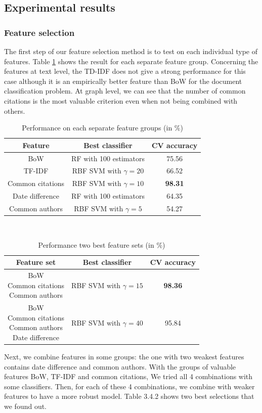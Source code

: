 \documentclass{article}
\begin{document}
\subsection{Experimental results}
\label{sec:result}
\subsubsection{Feature selection}
The first step of our feature selection method is to test on each individual type of features. Table \ref{tab:separate} shows the result for each separate feature group. Concerning the features at text level, the TD-IDF does not give a strong performance for this case although it is an empirically better feature than BoW for the document classification problem. At graph level, we can see that the number of common citations is the most valuable criterion even when not being combined with others. 
\begin{table}[t]
	\label{tab:separate}
	\centering
	\caption{Performance on each separate feature groups (in $\%$)}
	\begin{tabular}{|c|c|c|} \hline
		Feature&Best classifier&CV accuracy\\ \hline
		BoW&RF with 100 estimators&75.56\\ \hline
		TF-IDF&RBF SVM with $\gamma=20$&66.52\\ \hline
		Common citations&RBF SVM with $\gamma=10$&\textbf{98.31}\\ \hline
		Date difference&RF with 100 estimators&64.35\\ \hline
		Common authors&RBF SVM with $\gamma=5$&54.27\\ \hline
	\end{tabular}
\end{table}\\
\begin{table}[t]
	\label{tab:combination}
	\centering
	\caption{Performance two best feature sets (in $\%$)}
	\begin{tabular}{|c|c|c|} \hline
		Feature set&Best classifier&CV accuracy\\ \hline
		\pbox{20cm}{BoW\\Common citations\\Common authors}&RBF SVM with $\gamma=15$&\textbf{98.36}\\ \hline
		\pbox{20cm}{BoW\\Common citations\\Common authors\\Date difference}&RBF SVM with $\gamma=40$&95.84\\ \hline
	\end{tabular}
\end{table}
Next, we combine features in some groups: the one with two weakest features contains date difference and common authors. With the groups of valuable features BoW, TF-IDF and common citations, We tried all 4 combinations with some classifiers. Then, for each of these 4 combinations, we combine with weaker features to have a more robust model. Table 3.4.2 shows two best selections that we found out.
\end{document}
